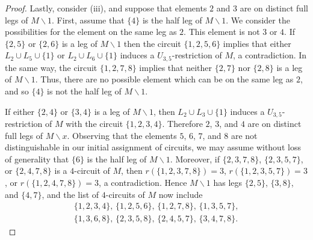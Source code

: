 \documentclass[11pt]{amsart}
\numberwithin{equation}{section} %
\begin{document}
\begin{proof}
Lastly, consider (iii), and suppose that elements $2$ and $3$ are on distinct full legs of $M\backslash 1$. First, assume that $\{4\}$ is the half leg of $M\backslash 1$. We consider the possibilities for the element on the same leg as $2$. This element is not $3$ or $4$. If $\{2,5\}$ or $\{2,6\}$ is a leg of $M \backslash 1$ then the circuit $\{1,2,5,6\}$ implies that either $L_2 \cup L_5 \cup \{1\}$ or $L_2 \cup L_6 \cup \{1\}$ induces a $U_{3,5}$-restriction of $M$, a contradiction. In the same way, the circuit $\{1,2,7,8\}$ implies that neither $\{2,7\}$ nor $\{2,8\}$ is a leg of $M \backslash 1$. Thus, there are no possible element which can be on the same leg as $2$, and so $\{4\}$ is not the half leg of $M \backslash 1$.

If either $\{2, 4\}$ or $\{3, 4\}$ is a leg of $M\backslash 1$, then $L_2\cup L_3\cup \{1\}$ induces a $U_{3, 5}$-restriction of $M$ with the circuit $\{1,2,3,4\}$. Therefore $2$, $3$, and $4$ are on distinct full legs of $M\backslash x$. Observing that the elements $5$, $6$, $7$, and $8$ are not distinguishable in our initial assignment of circuits, we may assume without loss of generality that $\{6\}$ is the half leg of $M\backslash 1$. Moreover, if $\{2, 3, 7, 8\}$, $\{2, 3, 5, 7\}$, or $\{2, 4, 7, 8\}$ is a $4$-circuit of $M$, then $r(\{1, 2, 3, 7, 8\})=3$, $r(\{1, 2, 3, 5, 7\})=3$, or $r(\{1, 2, 4, 7, 8\})=3$, a contradiction. Hence $M\backslash 1$ has legs $\{2, 5\}$, $\{3, 8\}$, and $\{4, 7\}$, and the list of $4$-circuits of $M$ now include
\begin{align*}
\{1, 2, 3, 4\},\, \{1, 2, 5, 6\},\, \{1, 2, 7, 8\},\, \{1, 3, 5, 7\}, \\
\{1, 3, 6, 8\},\, \{2, 3, 5, 8\},\, \{2, 4, 5, 7\},\, \{3, 4, 7, 8\}.
\end{align*}


\end{proof}
\end{document}
